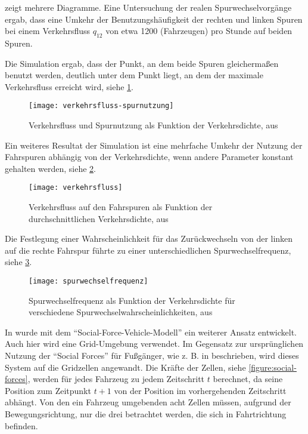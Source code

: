 \cite{multi-lane} zeigt mehrere Diagramme. Eine Untersuchung der realen Spurwechselvorgänge ergab, dass eine Umkehr der Benutzungshäufigkeit der rechten und linken Spuren bei einem Verkehrsfluss $q_{12}$ von etwa 1200 (Fahrzeugen) pro Stunde auf beiden Spuren.

Die Simulation ergab, dass der Punkt, an dem beide Spuren gleichermaßen benutzt werden, deutlich unter dem Punkt liegt, an dem der maximale Verkehrsfluss erreicht wird, siehe \cref{figure:verkehrsfluss-spurnutzung}.

\begin{figure}[hptb]
 \centering
 \texttt{[image: verkehrsfluss-spurnutzung]}
 \caption[Verkehrsfluss und Spurnutzung als Funktion der Verkehrsdichte]{Verkehrsfluss und Spurnutzung als Funktion der Verkehrsdichte, aus \cite{multi-lane}}
 \label{figure:verkehrsfluss-spurnutzung}
\end{figure}

Ein weiteres Resultat der Simulation ist eine mehrfache Umkehr der Nutzung der Fahrspuren abhängig von der Verkehrsdichte, wenn andere Parameter konstant gehalten werden, siehe \cref{figure:verkehrsfluss}.

\begin{figure}[hptb]
 \centering
 \texttt{[image: verkehrsfluss]}
 \caption[Verkehrsfluss als Funktion der durchschnittlichen Verkehrsdichte]{Verkehrsfluss auf den Fahrspuren als Funktion der durchschnittlichen Verkehrsdichte, aus \cite{multi-lane}}
 \label{figure:verkehrsfluss}
\end{figure}

Die Festlegung einer Wahrscheinlichkeit für das Zurückwechseln von der linken auf die rechte Fahrspur führte zu einer unterschiedlichen Spurwechselfrequenz, siehe \cref{figure:spurwechselfrequenz}.

\begin{figure}[hptb]
 \centering
 \texttt{[image: spurwechselfrequenz]}
 \caption[Spurwechselfrequenz als Funktion der Verkehrsdichte]{Spurwechselfrequenz als Funktion der Verkehrsdichte für verschiedene Spurwechselwahrscheinlichkeiten, aus \cite{multi-lane}}
 \label{figure:spurwechselfrequenz}
\end{figure}

In \cite{dat-ba} wurde mit dem \enquote{Social-Force-Vehicle-Modell} ein weiterer Ansatz entwickelt.
Auch hier wird eine Grid-Umgebung verwendet.
Im Gegensatz zur ursprünglichen Nutzung der \enquote{Social Forces} für Fußgänger, wie z. B. in \cite{soc-for} beschrieben, wird dieses System auf die Gridzellen angewandt. Die Kräfte der Zellen, siehe \cref{figure:social-forces}, werden für jedes Fahrzeug zu jedem Zeitschritt $t$ berechnet, da seine Position zum Zeitpunkt $t + 1$ von der Position im vorhergehenden Zeitschritt abhängt.
Von den ein Fahrzeug umgebenden acht Zellen müssen, aufgrund der Bewegungsrichtung, nur die drei betrachtet werden, die sich in Fahrtrichtung befinden.

